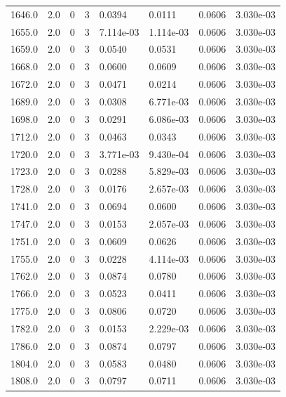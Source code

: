 \documentclass[preview]{standalone}
\begin{document}
{{{{{{{{{\begin{tabular}{L{1.2cm}C{1.2cm} C{0.3cm}C{0.5cm} C{1.4cm}C{1.4cm} C{1.4cm}C{1.4cm}}
  1646.0  &   2.0  & 0     &  3 &  0.0394  & 0.0111  & 0.0606 &  3.030e-03   \\ 
  1655.0  &   2.0  & 0     &  3 &  7.114e-03  & 1.114e-03  & 0.0606 &  3.030e-03   \\ 
  1659.0  &   2.0  & 0     &  3 &  0.0540  & 0.0531  & 0.0606 &  3.030e-03   \\ 
  1668.0  &   2.0  & 0     &  3 &  0.0600  & 0.0609  & 0.0606 &  3.030e-03   \\ 
  1672.0  &   2.0  & 0     &  3 &  0.0471  & 0.0214  & 0.0606 &  3.030e-03   \\ 
  1689.0  &   2.0  & 0     &  3 &  0.0308  & 6.771e-03  & 0.0606 &  3.030e-03   \\ 
  1698.0  &   2.0  & 0     &  3 &  0.0291  & 6.086e-03  & 0.0606 &  3.030e-03   \\ 
  1712.0  &   2.0  & 0     &  3 &  0.0463  & 0.0343  & 0.0606 &  3.030e-03   \\ 
  1720.0  &   2.0  & 0     &  3 &  3.771e-03  & 9.430e-04  & 0.0606 &  3.030e-03   \\ 
  1723.0  &   2.0  & 0     &  3 &  0.0288  & 5.829e-03  & 0.0606 &  3.030e-03   \\ 
  1728.0  &   2.0  & 0     &  3 &  0.0176  & 2.657e-03  & 0.0606 &  3.030e-03   \\ 
  1741.0  &   2.0  & 0     &  3 &  0.0694  & 0.0600  & 0.0606 &  3.030e-03   \\ 
  1747.0  &   2.0  & 0     &  3 &  0.0153  & 2.057e-03  & 0.0606 &  3.030e-03   \\ 
  1751.0  &   2.0  & 0     &  3 &  0.0609  & 0.0626  & 0.0606 &  3.030e-03   \\ 
  1755.0  &   2.0  & 0     &  3 &  0.0228  & 4.114e-03  & 0.0606 &  3.030e-03   \\ 
  1762.0  &   2.0  & 0     &  3 &  0.0874  & 0.0780  & 0.0606 &  3.030e-03   \\ 
  1766.0  &   2.0  & 0     &  3 &  0.0523  & 0.0411  & 0.0606 &  3.030e-03   \\ 
  1775.0  &   2.0  & 0     &  3 &  0.0806  & 0.0720  & 0.0606 &  3.030e-03   \\ 
  1782.0  &   2.0  & 0     &  3 &  0.0153  & 2.229e-03  & 0.0606 &  3.030e-03   \\ 
  1786.0  &   2.0  & 0     &  3 &  0.0874  & 0.0797  & 0.0606 &  3.030e-03   \\ 
  1804.0  &   2.0  & 0     &  3 &  0.0583  & 0.0480  & 0.0606 &  3.030e-03   \\ 
  1808.0  &   2.0  & 0     &  3 &  0.0797  & 0.0711  & 0.0606 &  3.030e-03   \\ 

\end{tabular}}}}}}}}}}
\end{document}
